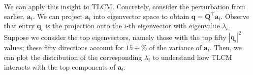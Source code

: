 

We can apply this insight to TLCM. Concretely, consider the perturbation from earlier, $\mathbf{a}_t$. We can project $\mathbf{a}_t$ into eigenvector space to obtain $\mathbf{q} = \mathbf{Q}^\top\mathbf{a}_t$. Observe that entry $\mathbf{q}_i$ is the projection onto the $i$-th eigenvector with eigenvalue $\lambda_i$. Suppose we consider the top eigenvectors, namely those with the top fifty $|\mathbf{q}_i|^2$ values; these fifty directions account for $15+$\% of the variance of $\mathbf{a}_t$. Then, we can plot the distribution of the corresponding $\lambda_i$ to understand how TLCM interacts with the top components of $\mathbf{a}_t$.






